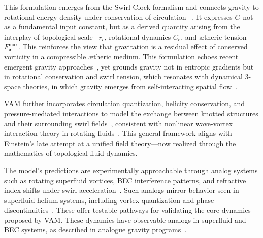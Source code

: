 This formulation emerges from the Swirl Clock formalism and connects gravity to rotational energy density under conservation of circulation~
\cite{VAM-2, VAM-13}. It expresses $G$ not as a fundamental input constant, but as a derived quantity arising from the interplay of topological scale~\cite{bartini2005constants} $r_c$, rotational dynamics $C_e$, and ætheric tension $F^{\max}_{\text{\ae}}$. This reinforces the view that gravitation is a residual effect of conserved vorticity in a compressible ætheric medium. This formulation echoes recent emergent gravity approaches~\cite{Verlinde2011,Hossenfelder2017}, yet grounds gravity not in entropic gradients but in rotational conservation and swirl tension, which resonates with dynamical 3-space theories, in which gravity emerges from self-interacting spatial flow~\cite{cahill2003dynamical}.

VAM further incorporates circulation quantization, helicity conservation, and pressure-mediated interactions to model the exchange between knotted structures and their surrounding swirl fields~\cite{VAM-8, VAM-11, VAM-14}, consistent with nonlinear wave-vortex interaction theory in rotating fluids~\cite{buhler2005wave}. This general framework aligns with Einstein’s late attempt at a unified field theory—now realized through the mathematics of topological fluid dynamics.

The model's predictions are experimentally approachable through analog systems such as rotating superfluid vortices, BEC interference patterns, and refractive index shifts under swirl acceleration~\cite{VAM-2, VAM-13}. Such analogs mirror behavior seen in superfluid helium systems, including vortex quantization and phase discontinuities~\cite{tilley_superfluid}.  These offer testable pathways for validating the core dynamics proposed by VAM. These dynamics have observable analogs in superfluid and BEC systems, as described in analogue gravity programs~\cite{barcelo2005}.


\vspace{1em}